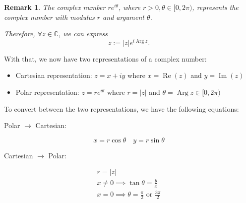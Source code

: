 \documentclass[11pt, oneside]{book}
\theoremstyle{break}
\newtheorem*{remark}{Remark}
\DeclareMathOperator{\re}{Re}
\DeclareMathOperator{\im}{Im}
\DeclareMathOperator{\caparg}{Arg}
\newcommand{\abs}[1]{\left|#1\right|}						%
\newcommand{\Arg}[1]{\caparg #1}
\begin{document}
\begin{remark}
	The complex number $re^{i \theta}$, where $r > 0, \theta \in [0, 2\pi)$, represents the complex number with modulus $r$ and argument $\theta$.
	\begin{center}
	\end{center}

	Therefore, $\forall z \in \mathbb{C}$, we can express
	\begin{equation}\label{eq:polar representation of a complex number}
		z := \abs{z} e^{i \Arg{z}}.
	\end{equation}
\end{remark}

With that, we now have two representations of a complex number:
\begin{itemize}
	\item Cartesian representation: $z = x + iy$ where $x = \re(z)$ and $y = \im(z)$
	\item Polar representation: $z = re^{i \theta}$ where $r = \abs{z}$ and $\theta = \Arg{z} \in [0, 2\pi)$
\end{itemize}

To convert between the two representations, we have the following equations:

Polar $\to$ Cartesian:

\begin{equation}\label{eq:polar to cartesian}
	x = r \cos \theta \quad y = r \sin \theta
\end{equation}

Cartesian $\to$ Polar:

\begin{gather}\label{eq:cartesian to polar}
	r = \abs{z} \nonumber \\
	x \neq 0 \implies \tan \theta = \frac{y}{x} \\
	x = 0 \implies \theta = \frac{\pi}{2} \text{ or } \frac{3\pi}{2} \nonumber
\end{gather}
\end{document}
